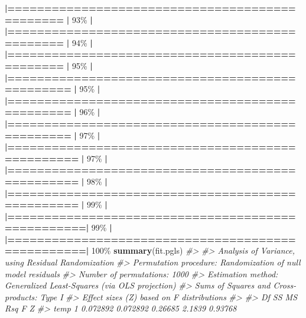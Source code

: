 \documentclass[
]{book}
\newenvironment{Shaded}{\begin{snugshade}}{\end{snugshade}}
\newcommand{\CommentTok}[1]{\textcolor[rgb]{0.56,0.35,0.01}{\textit{#1}}}
\newcommand{\DecValTok}[1]{\textcolor[rgb]{0.00,0.00,0.81}{#1}}
\newcommand{\ErrorTok}[1]{\textcolor[rgb]{0.64,0.00,0.00}{\textbf{#1}}}
\newcommand{\FunctionTok}[1]{\textcolor[rgb]{0.13,0.29,0.53}{\textbf{#1}}}
\newcommand{\NormalTok}[1]{#1}
\newcommand{\SpecialCharTok}[1]{\textcolor[rgb]{0.81,0.36,0.00}{\textbf{#1}}}
\begin{document}
\begin{Shaded}
\begin{Highlighting}[]
  \ErrorTok{|===============================================}   \ErrorTok{|}  \DecValTok{93}\NormalTok{\%}
  \SpecialCharTok{|}                                                        
  \ErrorTok{|===============================================}   \ErrorTok{|}  \DecValTok{94}\NormalTok{\%}
  \SpecialCharTok{|}                                                        
  \ErrorTok{|===============================================}   \ErrorTok{|}  \DecValTok{95}\NormalTok{\%}
  \SpecialCharTok{|}                                                        
  \ErrorTok{|================================================}  \ErrorTok{|}  \DecValTok{95}\NormalTok{\%}
  \SpecialCharTok{|}                                                        
  \ErrorTok{|================================================}  \ErrorTok{|}  \DecValTok{96}\NormalTok{\%}
  \SpecialCharTok{|}                                                        
  \ErrorTok{|================================================}  \ErrorTok{|}  \DecValTok{97}\NormalTok{\%}
  \SpecialCharTok{|}                                                        
  \ErrorTok{|=================================================} \ErrorTok{|}  \DecValTok{97}\NormalTok{\%}
  \SpecialCharTok{|}                                                        
  \ErrorTok{|=================================================} \ErrorTok{|}  \DecValTok{98}\NormalTok{\%}
  \SpecialCharTok{|}                                                        
  \ErrorTok{|=================================================} \ErrorTok{|}  \DecValTok{99}\NormalTok{\%}
  \SpecialCharTok{|}                                                        
  \ErrorTok{|==================================================|}  \DecValTok{99}\NormalTok{\%}
  \SpecialCharTok{|}                                                        
  \ErrorTok{|==================================================|} \DecValTok{100}\NormalTok{\%}
\FunctionTok{summary}\NormalTok{(fit.pgls)}
\CommentTok{\#\textgreater{} }
\CommentTok{\#\textgreater{} Analysis of Variance, using Residual Randomization}
\CommentTok{\#\textgreater{} Permutation procedure: Randomization of null model residuals }
\CommentTok{\#\textgreater{} Number of permutations: 1000 }
\CommentTok{\#\textgreater{} Estimation method: Generalized Least{-}Squares (via OLS projection) }
\CommentTok{\#\textgreater{} Sums of Squares and Cross{-}products: Type I }
\CommentTok{\#\textgreater{} Effect sizes (Z) based on F distributions}
\CommentTok{\#\textgreater{} }
\CommentTok{\#\textgreater{}           Df       SS       MS     Rsq      F       Z}
\CommentTok{\#\textgreater{} temp       1 0.072892 0.072892 0.26685 2.1839 0.93768}

\end{Highlighting}
\end{Shaded}
\end{document}
